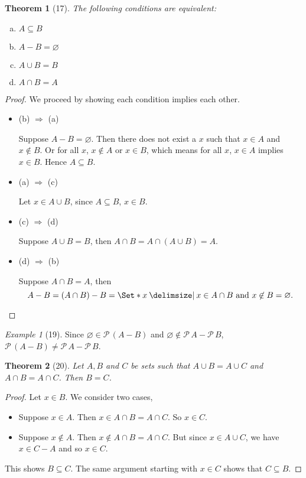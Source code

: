 \documentclass[12pt]{article}
\theoremstyle{plain}
\newtheorem*{exthm}{Theorem}
\theoremstyle{remark}
\newtheorem*{eg}{Example}
\theoremstyle{definition}
\theoremstyle{remark}
\newcommand{\powerset}{\mathscr{P}\,}
\providecommand\st{}
\newcommand\SetSymbol[1][]{%
\nonscript\:#1\vert%
\allowbreak%
\nonscript\:
\mathopen{}}
\renewcommand\st{\SetSymbol[\delimsize]}
\begin{document}
\begin{exthm}[17]
The following conditions are equivalent:
\begin{multicols}{2}
\begin{enumerate}[(a)]
\item $A \subseteq B$
\item $A - B = \varnothing$
\item $A \cup B = B$
\item $A \cap B = A$
\end{enumerate}
\end{multicols}
\end{exthm}
\begin{proof}
We proceed by showing each condition implies each other.
\begin{itemize}
\item (b) $\Rightarrow$ (a)

Suppose $A - B = \varnothing$. Then there does not exist a $x$ such that $x \in A$ and $x \not\in B$. Or for all $x$, $x \not\in A$ or $x \in B$, which means for all $x$, $x \in A$ implies $x \in B$. Hence $A \subseteq B$.
\item (a) $\Rightarrow$ (c)

Let $x \in A \cup B$, since $A \subseteq B$, $x \in B$.

\item (c) $\Rightarrow$ (d)

Suppose $A \cup B = B$, then $A \cap B = A \cap (A \cup B) = A$.

\item (d) $\Rightarrow$ (b)

Suppose $A \cap B = A$, then
\[
A - B = (A \cap B) - B = \Set*{x \st x \in A \cap B\ \text{and}\ x \not\in B} = \varnothing.
\]

\end{itemize}
\end{proof}
\begin{eg}[19]
Since $\varnothing \in \powerset (A - B)$ and $\varnothing \not\in \powerset A - \powerset B$, $\powerset(A - B) \neq \powerset A - \powerset B$.
\end{eg}

\begin{exthm}[20]
Let $A, B$ and $C$ be sets such that $A \cup B = A \cup C$ and $A \cap B = A \cap C$. Then $B = C$.
\end{exthm}
\begin{proof}
Let $x \in B$. We consider two cases,
\begin{itemize}
\item Suppose $x \in A$. Then $x \in A \cap B = A \cap C$. So $x \in C$.
\item Suppose $x \not\in A$. Then $x \not\in A \cap B = A \cap C$. But since $x \in A \cup C$, we have $x \in C - A$ and so $x \in C$.
\end{itemize}
This shows $B \subseteq C$. The same argument starting with $x \in C$ shows that $C \subseteq B$.
\end{proof}
\end{document}
